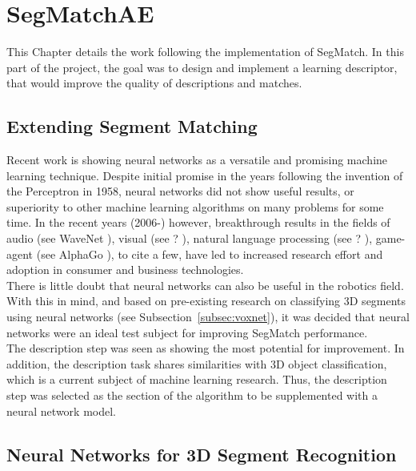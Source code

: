 \chapter{SegMatchAE}
\label{chap:segmatchAE}

This Chapter details the work following the implementation of SegMatch. In this part of the project, the goal was to design and implement a learning descriptor, that would improve the quality of descriptions and matches.\\

\section{Extending Segment Matching}
\label{sec:ae-intro}

Recent work is showing neural networks as a versatile and promising machine learning technique. Despite initial promise in the years following the invention of the Perceptron \cite{perceptron} in 1958, neural networks did not show useful results, or superiority to other machine learning algorithms on many problems for some time. In the recent years (2006-) however, breakthrough results in the fields of audio (see WaveNet \cite{wavenet}), visual (see ? \cite{inception?}), natural language processing (see ? \cite{?}), game-agent (see AlphaGo \cite{alphago}), to cite a few, have led to increased research effort and adoption in consumer \cite{snapchat-face-recognition} and business \cite{google-cooling} technologies.\\

There is little doubt that neural networks can also be useful in the robotics field. With this in mind, and based on pre-existing research on classifying 3D segments using neural networks (see Subsection~\ref{subsec:voxnet}), it was decided that neural networks were an ideal test subject for improving SegMatch performance.\\

The description step was seen as showing the most potential for improvement. In addition, the description task shares similarities with 3D object classification, which is a current subject of machine learning research. Thus, the description step was selected as the section of the algorithm to be supplemented with a neural network model.\\

\section{Neural Networks for 3D Segment Recognition}
\label{sec:neural-nets}

